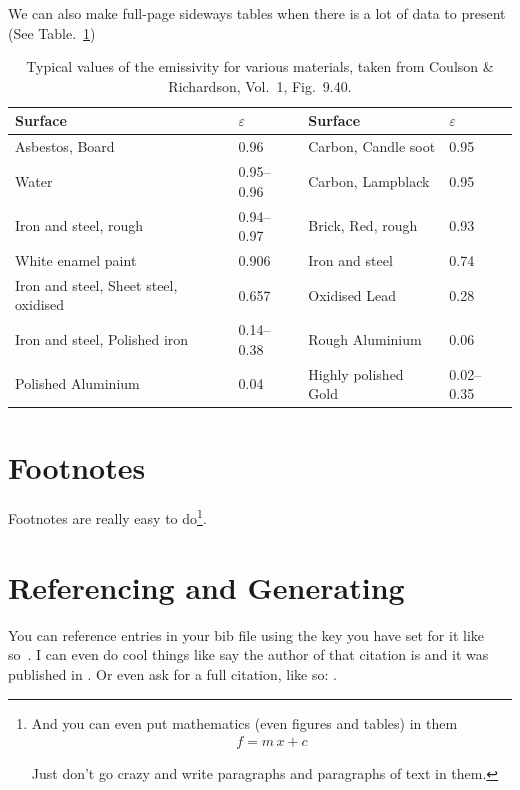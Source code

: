 \documentclass[12pt]{UoAThesis}
\begin{document}
We can also make full-page sideways tables when there is a lot of data
to present (See Table.~\ref{tab:BigTable})
\begin{table}
  \begin{center}
    \begin{tabular}{|p{6.5cm}|p{2.0cm}|||p{4.5cm}|p{2.5cm}|}
      Surface & $\varepsilon$ & Surface & $\varepsilon$ 
      \\\hline\hline%
      Asbestos, Board & 0.96 & Carbon, Candle soot & 0.95 \\
      Water & 0.95--0.96 & Carbon, Lampblack & 0.95\\
      Iron and steel, rough & 0.94--0.97 & Brick, Red, rough & 0.93\\
      White enamel paint & 0.906 & Iron and steel & 0.74\\
      Iron and steel, Sheet steel, oxidised & 0.657 & Oxidised Lead  & 0.28\\
      Iron and steel, Polished iron & 0.14--0.38 & Rough Aluminium & 0.06\\
      Polished Aluminium & 0.04 & Highly polished Gold & 0.02--0.35
    \end{tabular}
  \end{center}
  \caption[Typical values of the emissivity for various materials (sideways)]{
    \label{tab:BigTable}Typical values of the emissivity for various materials, 
    taken from Coulson \& Richardson, Vol.~1, Fig.~9.40.
}
\end{table}

\section{Footnotes}
Footnotes are really easy to do\footnote{And you can even put mathematics (even figures and tables) in them 
  \begin{align}
    f=m\,x+c
  \end{align}
  
  Just don't go crazy and write paragraphs and paragraphs of text in
  them. 
}.

\section{Referencing and Generating}
You can reference entries in your bib file using the key you have set
for it like so~\cite{Bannerman_2009}. I can even do cool things like
say the author of that citation is \citeauthor{Bannerman_2009} and it
was published in \citeyear{Bannerman_2009}. Or even ask for a full
citation, like so: .
\end{document}
